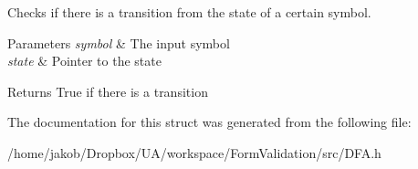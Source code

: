 Checks if there is a transition from the state of a certain symbol. 


\begin{DoxyParams}{Parameters}
{\em symbol} & The input symbol \\
\hline
{\em state} & Pointer to the state\\
\hline
\end{DoxyParams}
\begin{DoxyReturn}{Returns}
True if there is a transition 
\end{DoxyReturn}


The documentation for this struct was generated from the following file\-:\begin{DoxyCompactItemize}
\item 
/home/jakob/\-Dropbox/\-U\-A/workspace/\-Form\-Validation/src/D\-F\-A.\-h\end{DoxyCompactItemize}
